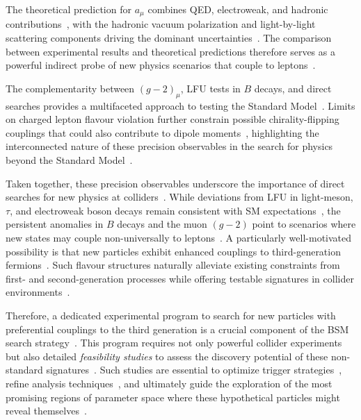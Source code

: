 The theoretical prediction for $a_\mu$ combines QED, electroweak, and hadronic contributions~\cite{Aoyama:2020ynm}, with the hadronic vacuum polarization and light-by-light scattering components driving the dominant uncertainties~\parencite{arxiv.1311.2198,1674-1137-40-10-100001}. The comparison between experimental results and theoretical predictions therefore serves as a powerful indirect probe of new physics scenarios that couple to leptons~\cite{Aoyama:2020ynm}.

The complementarity between $(g-2)_\mu$, LFU tests in $B$ decays, and direct searches provides a multifaceted approach to testing the Standard Model~\cite{Ciuchini:2022wbq,Greljo:2022jac}. Limits on charged lepton flavour violation further constrain possible chirality-flipping couplings that could also contribute to dipole moments~\cite{Blankenburg:2012nx,Angelescu:2018tyl}, highlighting the interconnected nature of these precision observables in the search for physics beyond the Standard Model~\cite{Dorsner:2016wpm}.

Taken together, these precision observables underscore the importance of direct searches for new physics at colliders~\cite{CMS:2020wzx,ATLAS:2019qpq}. While deviations from LFU in light-meson, $\tau$, and electroweak boson decays remain consistent with SM expectations~\cite{1674-1137-40-10-100001,LEPEW:2006}, the persistent anomalies in $B$ decays and the muon $(g-2)$ point to scenarios where new states may couple non-universally to leptons~\cite{Buttazzo:2017ixm,Aoyama:2020ynm}. A particularly well-motivated possibility is that new particles exhibit enhanced couplings to third-generation fermions~\cite{Greljo:2018tuh,DiLuzio:2018zxy}. Such flavour structures naturally alleviate existing constraints from first- and second-generation processes while offering testable signatures in collider environments~\cite{Angelescu:2021lln,Cornella:2021sby}. 

Therefore, a dedicated experimental program to search for new particles with preferential couplings to the third generation is a crucial component of the BSM search strategy~\cite{CMS:2020wzx,ATLAS:2019qpq}. This program requires not only powerful collider experiments~\cite{ATLAS:2008xda,CMS:2008xjf} but also detailed \textit{feasibility studies} to assess the discovery potential of these non-standard signatures~\cite{Faroughy:2016osc,Baker:2019sli}. Such studies are essential to optimize trigger strategies~\cite{ATLAS:2008xda,CMS:2008xjf}, refine analysis techniques~\cite{Cowan:2011}, and ultimately guide the exploration of the most promising regions of parameter space where these hypothetical particles might reveal themselves~\cite{Dorsner:2016wpm}.
